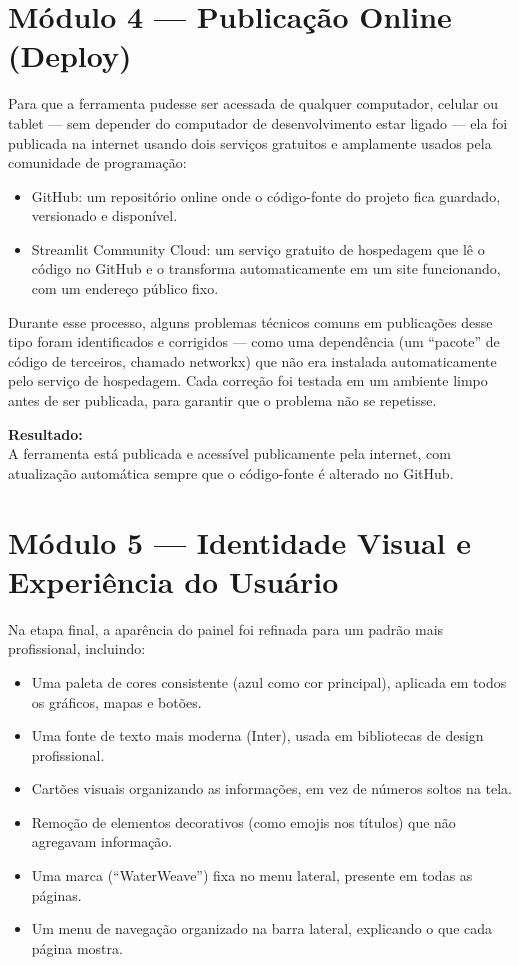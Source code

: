 \documentclass[11pt,a4paper]{article}
\begin{document}
\section{Módulo 4 — Publicação Online (Deploy)}

Para que a ferramenta pudesse ser acessada de qualquer computador, celular ou tablet — sem depender do computador de desenvolvimento estar ligado — ela foi publicada na internet usando dois serviços gratuitos e amplamente usados pela comunidade de programação:

\begin{itemize}
\item GitHub: um repositório online onde o código-fonte do projeto fica guardado, versionado e disponível.
\item Streamlit Community Cloud: um serviço gratuito de hospedagem que lê o código no GitHub e o transforma automaticamente em um site funcionando, com um endereço público fixo.
\end{itemize}

Durante esse processo, alguns problemas técnicos comuns em publicações desse tipo foram identificados e corrigidos — como uma dependência (um ``pacote'' de código de terceiros, chamado networkx) que não era instalada automaticamente pelo serviço de hospedagem. Cada correção foi testada em um ambiente limpo antes de ser publicada, para garantir que o problema não se repetisse.

\begin{calloutbox}
\textbf{Resultado:}\\
A ferramenta está publicada e acessível publicamente pela internet, com atualização automática sempre que o código-fonte é alterado no GitHub.
\end{calloutbox}

\section{Módulo 5 — Identidade Visual e Experiência do Usuário}

Na etapa final, a aparência do painel foi refinada para um padrão mais profissional, incluindo:

\begin{itemize}
\item Uma paleta de cores consistente (azul como cor principal), aplicada em todos os gráficos, mapas e botões.
\item Uma fonte de texto mais moderna (Inter), usada em bibliotecas de design profissional.
\item Cartões visuais organizando as informações, em vez de números soltos na tela.
\item Remoção de elementos decorativos (como emojis nos títulos) que não agregavam informação.
\item Uma marca (``WaterWeave'') fixa no menu lateral, presente em todas as páginas.
\item Um menu de navegação organizado na barra lateral, explicando o que cada página mostra.
\end{itemize}
\end{document}
